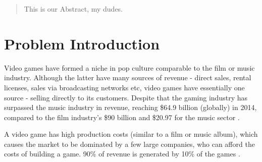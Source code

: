 \documentclass[12p]{article}
\begin{document}

\begin{abstract}
\thispagestyle{plain} %
  This is our Abstract, my dudes.

\end{abstract}

\newpage


\tableofcontents %
\thispagestyle{plain} %

\newpage %


\section{Problem Introduction} \label{ProblemIntroduction}

Video games have formed a niche in pop culture comparable to the film or music industry. Although the latter have many sources of revenue - direct sales, rental licenses, sales via broadcasting networks etc, video games have essentially one source - selling directly to its customers. Despite that the gaming industry has surpassed the music industry in revenue, reaching \$64.9 billion (globally) in 2014, compared to the film industry’s \$90 billion and \$20.97 for the music sector \cite{UnderstandingVideoGames}.

A video game has high production costs (similar to a film or music album), which causes the market to be dominated by a few large companies, who can afford the costs of building a game. 90\% of revenue is generated by 10\% of the games \cite{UnderstandingVideoGames}.
\end{document}

